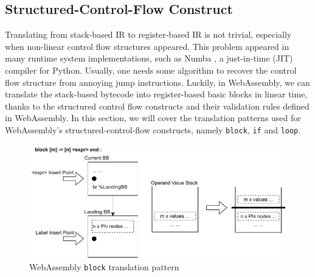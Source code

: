 \subsection{Structured-Control-Flow Construct}
\label{section:mir-translation-cfg-construct}

Translating from stack-based IR to register-based IR is not trivial, especially
when non-linear control flow structures appeared. This problem appeared in many
runtime system implementations, such as Numba \cite{numba}, a just-in-time (JIT)
compiler for Python. Usually, one needs some algorithm to recover the control
flow structure from annoying jump instructions. Luckily, in WebAssembly, we can
translate the stack-based bytecode into register-based basic blocks in linear
time, thanks to the structured control flow constructs and their validation
rules defined in WebAssembly. In this section, we will cover the translation
patterns used for WebAssembly's structured-control-flow constructs, namely
\texttt{block}, \texttt{if} and \texttt{loop}.

\begin{figure}
  \centering
  \includegraphics[width=\textwidth]{Images/4.MIR/translate-block.pdf}
  \caption{WebAssembly \texttt{block} translation pattern}
  \label{fig:translate-block}
\end{figure}

